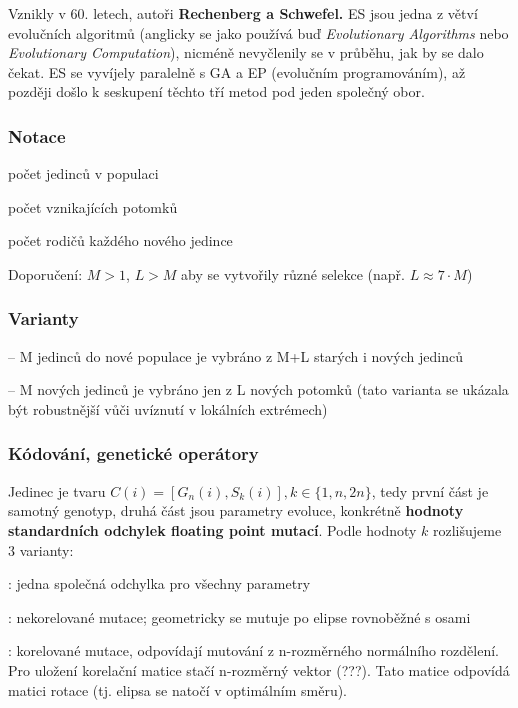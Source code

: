Vznikly v 60. letech, autoři \textbf{Rechenberg a Schwefel.} ES jsou jedna z větví evolučních algoritmů (anglicky se jako  používá buď \textit{Evolutionary Algorithms} nebo \textit{Evolutionary Computation}), nicméně nevyčlenily se v průběhu, jak by se dalo čekat. ES se vyvíjely paralelně s GA a EP (evolučním programováním), až později došlo k seskupení těchto tří metod pod jeden společný obor.

\subsubsection{Notace}
\begin{description}
	\leftskip 20pt
	\setlength{\itemsep}{0pt}
	\item[\textit{M}] počet jedinců v populaci
	\item[\textit{L}] počet vznikajících potomků
	\item[\textit{R}] počet rodičů každého nového jedince
\end{description}
Doporučení: $M > 1$, $L > M$ aby se vytvořily různé selekce (např. $L \approx 7 \cdot M$)

\subsubsection{Varianty}
\begin{description}
	\leftskip 20pt
	\setlength{\itemsep}{0pt}
	\item[\textit{(M+L)} ES] -- M jedinců do nové populace je vybráno z M+L starých i nových jedinců
	\item[\textit{(M,L)} ES] -- M nových jedinců je vybráno jen z L nových potomků (tato varianta se ukázala být robustnější vůči uvíznutí v lokálních extrémech)
\end{description}

\subsubsection{Kódování, genetické operátory}
Jedinec je tvaru $C(i) = [G_n(i), S_k(i)], k \in \{1, n, 2n\}$, tedy první část je samotný genotyp, druhá část jsou parametry evoluce, konkrétně \textbf{hodnoty standardních odchylek floating point mutací}. Podle hodnoty $k$ rozlišujeme 3 varianty:
\begin{description}
	\leftskip 20pt
	\setlength{\itemsep}{0pt}
	\item[k=1]: jedna společná odchylka pro všechny parametry
	\item[k=n]: nekorelované mutace; geometricky se mutuje po elipse rovnoběžné s osami
	\item[k=2n]: korelované mutace, odpovídají mutování z n-rozměrného normálního rozdělení. 
	Pro uložení korelační matice stačí n-rozměrný vektor (???). Tato matice odpovídá matici rotace (tj. elipsa se natočí v optimálním směru).
\end{description}

